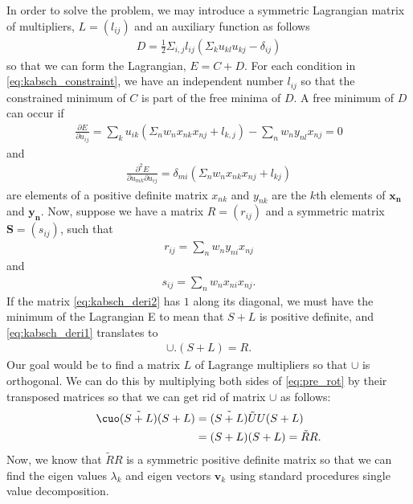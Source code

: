  In order to solve the problem, we may introduce a symmetric Lagrangian matrix of multipliers, $L = (l_{ij})$ and an auxiliary function as follows
 \begin{align}
 	D = \frac{1}{2} \Sigma_{i,j} l_{ij} \left(\Sigma_k u_{kl} u_{kj} - \delta_{ij}\right)
 \end{align}
 so that we can form the Lagrangian, $E= C+D$. For each condition in \autoref{eq:kabsch_constraint}, we have an independent number $l_{ij}$ so that the constrained minimum of $C$ is part of the free minima of $D$. A free minimum of $D$ can occur if
 \begin{align}
 	\frac{\partial E}{\partial u_{ij}} = \sum_k u_{ik} \left(\Sigma_n w_n x_{nk}x_{nj} + l_{k,j}\right) - \sum_n w_n y_{nl} x_{nj} = 0
 	\label{eq:kabsch_deri1}
 \end{align}
 and 
 \begin{align}
 	\frac{\partial^2 E}{\partial u_{mk} \partial u_{ij}} = \delta_{mi} \left(\Sigma_n w_n x_{nk} x_{nj} + l_{kj}\right)
 	\label{eq:kabsch_deri2}
 \end{align}
 are elements of a positive definite matrix $x_{nk}$ and $y_{nk}$ are the $k$th elements of $\bm{x_n}$ and $\bm{y_n}$. Now, suppose we have a matrix $R=(r_{ij})$ and a symmetric matrix $\bm{S} = \left(s_{ij}\right)$, such that
 \begin{align}
 	r_{ij} = \sum_n w_n y_{ni} x_{nj}
 \end{align}
 and
 \begin{align}
 	s_{ij} = \sum_n w_n x_{ni} x_{nj}.
 \end{align}
 If the matrix \eqref{eq:kabsch_deri2} has $1$ along its diagonal, we must have the minimum of the Lagrangian E to mean that $S+L$ is positive definite, and \eqref{eq:kabsch_deri1} translates to 
 \begin{align}
 \cup . \left(S+L\right) = R.
 \label{eq:pre_rot}
 \end{align}
 Our goal would be to find a matrix $L$ of Lagrange multipliers so that $\cup$ is orthogonal. We can do this by multiplying both sides of \eqref{eq:pre_rot} by their transposed matrices so that we can get rid of matrix $\cup$ as follows:
 \begin{align}
 	\cuo \tilde{(S+L)}(S+L) &= \tilde{(S+L)}\tilde{U}U(S+L) \nonumber \\
 	&= (S+L)(S+L) = \tilde{R}R.
 \end{align}
 Now, we know that $\tilde{R}R$ is a symmetric positive definite matrix so that we can find the eigen values $\lambda_k$ and eigen vectors $\bm{v}_k$ using standard procedures \eg single value decomposition.